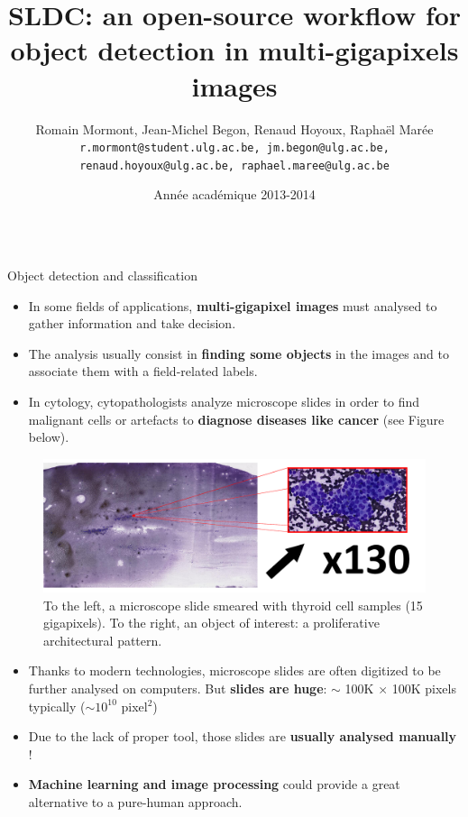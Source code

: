 \documentclass{beamer}
\title{SLDC: an open-source workflow for object detection in multi-gigapixels images}
\author{Romain Mormont, Jean-Michel Begon, Renaud Hoyoux, Raphaël Marée\\
{\tt r.mormont@student.ulg.ac.be, jm.begon@ulg.ac.be, renaud.hoyoux@ulg.ac.be, raphael.maree@ulg.ac.be}}
\institute{Systems and modeling, Department of EE \& CS, University of Liège, Belgium}
\date{Année académique 2013-2014}
\begin{document}
\begin{frame}

\vspace*{-1cm}
\begin{columns}[t]

\column{.45\paperwidth}


\begin{block}{Object detection and classification}	
\begin{itemize}
\item In some fields of applications, \textbf{multi-gigapixel images} must analysed to gather information and take decision.
\item The analysis usually consist in \textbf{finding some objects} in the images and to associate them with a field-related labels.
\item In cytology, cytopathologists analyze microscope slides in order to find malignant cells or artefacts to \textbf{diagnose diseases like cancer} (see Figure below).
\end{itemize}

\begin{figure}[H]
\center
\includegraphics[scale=0.6]{images/whole-slide-dim.png}
\caption{To the left, a microscope slide smeared with thyroid cell samples (15 gigapixels). To the right, an object of interest: a proliferative architectural pattern.}
\end{figure}

\begin{itemize}
\item Thanks to modern technologies, microscope slides are often digitized to be further analysed on computers. But \textbf{slides are huge}: $\sim$ 100K $\times$ 100K pixels typically  ($\sim 10^{10}$ pixel$^2$)
\item Due to the lack of proper tool, those slides are \textbf{usually analysed manually} ! 
\item \textbf{Machine learning and image processing} could provide a great alternative to a pure-human approach.
\end{itemize}		


\end{block}
\end{columns}
\end{frame}
\end{document}

